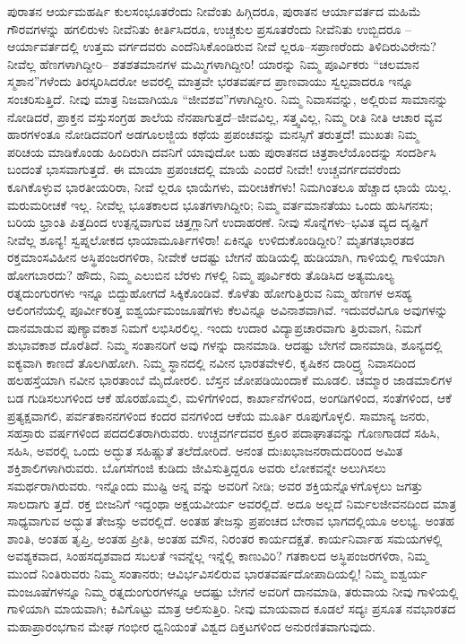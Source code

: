 ಪುರಾತನ ಆರ್ಯಮಹರ್ಷಿ ಕುಲಸಂಭೂತರೆಂದು ನೀವೆಂತು ಹಿಗ್ಗಿದರೂ, ಪುರಾತನ ಆರ್ಯಾವರ್ತದ ಮಹಿಮೆ ಗೌರವಗಳನ್ನು ಹಗಲಿರುಳು ನೀವೆನಿತು ಕೀರ್ತಿಸಿದರೂ, ಉಚ್ಚಕುಲ ಪ್ರಸೂತರೆಂದು ನೀವೆನಿತು ಉಬ್ಬಿದರೂ –ಆರ್ಯಾವರ್ತದಲ್ಲಿ ಉತ್ತಮ ವರ್ಗದವರು ಎಂದೆನಿಸಿಕೊಂಡಿರುವ ನೀವೆ ಲ್ಲರೂ–ಸಪ್ರಾಣರೆಂದು ತಿಳಿದಿರುವಿರೇನು? ನೀವೆಲ್ಲ ಹೆಣಗಳಾಗಿದ್ದೀರಿ– ಶತಶತಮಾನಗಳ ಮಮ್ಮಿಗಳಾಗಿದ್ದೀರಿ! ಯಾರನ್ನು ನಿಮ್ಮ ಪೂರ್ವಿಕರು “ಚಲಮಾನ ಸ್ಮಶಾನ”ಗಳೆಂದು ತಿರಸ್ಕರಿಸಿದರೋ ಅವರಲ್ಲಿ ಮಾತ್ರವೇ ಭರತವರ್ಷದ ಪ್ರಾಣವಾಯು ಸ್ವಲ್ಪವಾದರೂ ಇನ್ನೂ ಸಂಚರಿಸುತ್ತಿದೆ. ನೀವು ಮಾತ್ರ ನಿಜವಾಗಿಯೂ “ಜೀವಶವ”ಗಳಾಗಿದ್ದೀರಿ. ನಿಮ್ಮ ನಿವಾಸವನ್ನು, ಅಲ್ಲಿರುವ ಸಾಮಾನನ್ನು ನೋಡಿದರೆ, ಪ್ರಾಕ್ತನ ವಸ್ತುಸಂಗ್ರಹ ಶಾಲೆಯ ನೆನಪಾಗುತ್ತದೆ–ಜೀವವಿಲ್ಲ, ಸತ್ತ್ವವಿಲ್ಲ, ನಿಮ್ಮ ರೀತಿ ನೀತಿ ಆಚಾರ ವ್ಯವ ಹಾರಗಳಂತೂ ನೋಡಿದವರಿಗೆ ಅಡಗೂಲಜ್ಜಿಯ ಕಥೆಯ ಪ್ರಪಂಚವನ್ನು ಮನಸ್ಸಿಗೆ ತರುತ್ತದೆ! ಮುಖತಃ ನಿಮ್ಮ ಪರಿಚಯ ಮಾಡಿಕೊಂಡು ಹಿಂದಿರುಗಿ ದವನಿಗೆ ಯಾವುದೋ ಬಹು ಪುರಾತನದ ಚಿತ್ರಶಾಲೆಯೊಂದನ್ನು ಸಂದರ್ಶಿಸಿ ಬಂದಂತೆ ಭಾಸವಾಗುತ್ತದೆ. ಈ ಮಾಯಾ ಪ್ರಪಂಚದಲ್ಲಿ ಮಾಯೆ ಎಂದರೆ ನೀವೇ! ಉಚ್ಚವರ್ಗದವರೆಂದು ಕೂಗಿಕೊಳ್ಳುವ ಭಾರತೀಯರಿರಾ, ನೀವೆ ಲ್ಲರೂ ಛಾಯೆಗಳು, ಮರೀಚಿಕೆಗಳು! ನಿಮಗಿಂತಲೂ ಹೆಚ್ಚಾದ ಛಾಯೆ ಯಿಲ್ಲ. ಮರುಮರೀಚಕೆ ಇಲ್ಲ. ನೀವೆಲ್ಲ ಭೂತಕಾಲದ ಭೂತಗಳಾಗಿದ್ದೀರಿ; ನಿಮ್ಮ ವರ್ತಮಾನತೆಯು ಒಂದು ಹುಸಿಗನಸು; ಬರಿಯ ಭ್ರಾಂತಿ ಪಿತ್ತದಿಂದ ಉತ್ಪನ್ನವಾಗುವ ಚಿತ್ತಗ್ಲಾನಿಗೆ ಉದಾಹರಣೆ. ನೀವು ಸೊನ್ನೆಗಳು–ಭವಿತ ವ್ಯದ ದೃಷ್ಟಿಗೆ ನೀವೆಲ್ಲ ಶೂನ್ಯ! ಸ್ವಪ್ನಲೋಕದ ಛಾಯಾಮೂರ್ತಿಗಳಿರಾ! ಏಕಿನ್ನೂ ಉಳಿದುಕೊಂಡಿದ್ದೀರಿ? ಮೃತಗತಭಾರತದ ರಕ್ತಮಾಂಸವಿಹೀನ ಅಸ್ಥಿಪಂಜರಗಳಿರಾ, ನೀವೇಕೆ ಆದಷ್ಟು ಬೇಗನೆ ಹುಡಿಯಲ್ಲಿ ಹುಡಿಯಾಗಿ, ಗಾಳಿಯಲ್ಲಿ ಗಾಳಿಯಾಗಿ ಹೋಗಬಾರದು? ಹೌದು, ನಿಮ್ಮ ಎಲುಬಿನ ಬೆರಳು ಗಳಲ್ಲಿ ನಿಮ್ಮ ಪೂರ್ವಿಕರು ತೊಡಿಸಿದ ಅತ್ಯಮೂಲ್ಯ ರತ್ನದುಂಗುರಗಳು ಇನ್ನೂ ಬಿದ್ದುಹೋಗದೆ ಸಿಕ್ಕಿಕೊಂಡಿವೆ. ಕೊಳೆತು ಹೋಗುತ್ತಿರುವ ನಿಮ್ಮ ಹೆಣಗಳ ಅಸಹ್ಯ ಆಲಿಂಗನೆಯಲ್ಲಿ ಪೂರ್ವೀಕರಿತ್ತ ಐಶ್ವರ್ಯಮಂಜೂಷೆಗಳು ಕೆಲವಿನ್ನೂ ಅವಿನಾಶವಾಗಿವೆ. ಇದುವರೆವಿಗೂ ಅವುಗಳನ್ನು ದಾನಮಾಡುವ ಪುಣ್ಯಾವಕಾಶ ನಿಮಗೆ ಲಭಿಸಿರಲಿಲ್ಲ. ಇಂದು ಉದಾರ ವಿದ್ಯಾಪ್ರಚಾರವಾಗು ತ್ತಿರುವಾಗ, ನಿಮಗೆ ಶುಭಾವಕಾಶ ದೊರೆತಿದೆ. ನಿಮ್ಮ ಸಂತಾನರಿಗೆ ಅವು ಗಳನ್ನು ದಾನಮಾಡಿ. ಆದಷ್ಟು ಬೇಗನೆ ದಾನಮಾಡಿ, ಶೂನ್ಯದಲ್ಲಿ ಐಕ್ಯವಾಗಿ ಕಾಣದೆ ತೊಲಗಿಹೋಗಿ. ನಿಮ್ಮ ಸ್ಥಾನದಲ್ಲಿ ನವೀನ ಭಾರತವೇಳಲಿ, ಕೃಷಿಕನ ದಾರಿದ್ರ್ಯ ನಿವಾಸದಿಂದ ಹಲಹಸ್ತೆಯಾಗಿ ನವೀನ ಭಾರತಾಂಬೆ ಮೈದೋರಲಿ. ಬೆಸ್ತನ ಜೋಪಡಿಯಿಂದಾಕೆ ಮೂಡಲಿ. ಚಮ್ಮಾರ ಜಾಡಮಾಲಿಗಳ ಬಡ ಗುಡಿಸಲುಗಳಿಂದ ಆಕೆ ಹೊರಹೊಮ್ಮಲಿ, ಮಳಿಗೆಗಳಿಂದ, ಕಾರ್ಖಾನೆಗಳಿಂದ, ಅಂಗಡಿಗಳಿಂದ, ಸಂತೆಗಳಿಂದ, ಆಕೆ ಪ್ರತ್ಯಕ್ಷವಾಗಲಿ, ಪರ್ವತಕಾನನಗಳಿಂದ ಕಂದರ ವನಗಳಿಂದ ಆಕೆಯ ಮೂರ್ತಿ ರೂಪುಗೊಳ್ಳಲಿ. ಸಾಮಾನ್ಯ ಜನರು, ಸಹಸ್ರಾರು ವರ್ಷಗಳಿಂದ ಪದದಲಿತರಾಗಿರುವರು. ಉಚ್ಚವರ್ಗದವರ ಕ್ರೂರ ಪದಾಘಾತವನ್ನು ಗೊಣಗಾಡದೆ ಸಹಿಸಿ, ಸಹಿಸಿ, ಅವರಲ್ಲಿ ಒಂದು ಅದ್ಭುತ ಸಹಿಷ್ಣುತೆ ತಲೆದೋರಿದೆ. ಅನಂತ ದುಃಖಭಾಜನರಾದುದರಿಂದ ಅಮಿತ ಶಕ್ತಿಶಾಲಿಗಳಾಗಿರುವರು. ಬೊಗಸೆಗಂಜಿ ಕುಡಿದು ಜೀವಿಸುತ್ತಿದ್ದರೂ ಅವರು ಲೋಕವನ್ನೇ ಅಲುಗಿಸಲು ಸಮರ್ಥರಾಗಿರುವರು. ಇನ್ನೊಂದು ಮುಷ್ಟಿ ಅನ್ನ ವನ್ನು ಅವರಿಗೆ ನೀಡಿ; ಅವರ ಶಕ್ತಿಯನ್ನೊಳಗೊಳ್ಳಲು ಜಗತ್ತು ಸಾಲದಾಗು ತ್ತದೆ. ರಕ್ತ ಬೀಜನಿಗೆ ಇದ್ದಂಥಾ ಅಕ್ಷಯವೀರ್ಯ ಅವರಲ್ಲಿದೆ. ಅದೂ ಅಲ್ಲದೆ ನಿರ್ಮಲಜೀವನದಿಂದ ಮಾತ್ರ ಸಾಧ್ಯವಾಗುವ ಅದ್ಭುತ ತೇಜಸ್ಸು ಅವರಲ್ಲಿದೆ. ಅಂತಹ ತೇಜಸ್ಸು ಪ್ರಪಂಚದ ಬೇರಾವ ಭಾಗದಲ್ಲಿಯೂ ಅಲಭ್ಯ. ಅಂತಹ ಶಾಂತಿ, ಅಂತಹ ತೃಪ್ತಿ, ಅಂತಹ ಪ್ರೀತಿ, ಅಂತಹ ಮೌನ, ನಿರಂತರ ಕಾರ್ಯದಕ್ಷತೆ. ಕಾರ್ಯನಿರ್ವಾಹ ಸಮಯಗಳಲ್ಲಿ ಅವಶ್ಯಕವಾದ, ಸಿಂಹಸದೃಶವಾದ ಸಬಲತೆ ಇವನ್ನೆಲ್ಲ ಇನ್ನೆಲ್ಲಿ ಕಾಣುವಿರಿ? ಗತಕಾಲದ ಅಸ್ಥಿಪಂಜರಗಳಿರಾ, ನಿಮ್ಮ ಮುಂದೆ ನಿಂತಿರುವರು ನಿಮ್ಮ ಸಂತಾನರು; ಆವಿರ್ಭವಿಸಲಿರುವ ಭಾರತವರ್ಷದೋಪಾದಿಯಲ್ಲಿ! ನಿಮ್ಮ ಐಶ್ವರ್ಯ ಮಂಜೂಷೆಗಳನ್ನೂ ನಿಮ್ಮ ರತ್ನದುಂಗುರಗಳನ್ನೂ ಆದಷ್ಟು ಬೇಗನೆ ಅವರಿಗೆ ದಾನಮಾಡಿ, ತರುವಾಯ ನೀವು ಗಾಳಿಯಲ್ಲಿ ಗಾಳಿಯಾಗಿ ಮಾಯವಾಗಿ; ಕಿವಿಗೊಟ್ಟು ಮಾತ್ರ ಆಲಿಸುತ್ತಿರಿ. ನೀವು ಮಾಯವಾದ ಕೂಡಲೆ ಸದ್ಯಃ ಪ್ರಸೂತ ನವಭಾರತದ ಮಹಾಪ್ರಾರಂಭಗಾನ ಮೇಘ ಗಂಭೀರ ಧ್ವನಿಯಂತೆ ವಿಶ್ವದ ದಿಕ್ತಟಗಳಿಂದ ಅನುರಣಿತವಾಗುವುದು.

